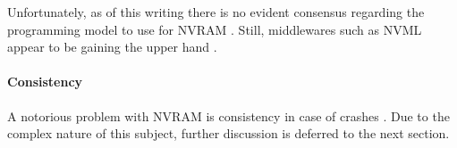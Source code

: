 Unfortunately, as of this writing there is no evident consensus regarding the
programming model to use for NVRAM \cite{boehm2016persistence}. Still,
middlewares such as NVML appear to be gaining the upper hand
\cite{oukid2017data, volos2017whisper, malinowski2017using, andrei2017sap}.

\paragraph{Consistency}

A notorious problem with NVRAM is consistency in case of crashes
\cite{condit2009better, dulloor2014system, oukid2017data}. Due to the complex
nature of this subject, further discussion is deferred to the next section.
